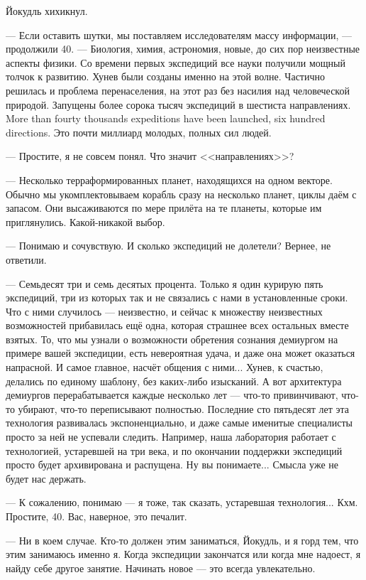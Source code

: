 Йокудль хихикнул.

--- Если оставить шутки, мы поставляем исследователям массу информации, --- продолжили 40.
--- Биология, химия, астрономия, новые, до сих пор неизвестные аспекты физики.
Со времени первых экспедиций все науки получили мощный толчок к развитию.
Хунев были созданы именно на этой волне.
Частично решилась и проблема перенаселения, на этот раз без насилия над человеческой природой.
{Запущены более сорока тысяч экспедиций в шестиста направлениях.}
{More than fourty thousands expeditions have been launched, six hundred directions.}
Это почти миллиард молодых, полных сил людей.

--- Простите, я не совсем понял.
Что значит <<направлениях>>?

--- Несколько терраформированных планет, находящихся на одном векторе.
Обычно мы укомплектовываем корабль сразу на несколько планет, циклы даём с запасом.
Они высаживаются по мере прилёта на те планеты, которые им приглянулись.
Какой-никакой выбор.

--- Понимаю и сочувствую.
И сколько экспедиций не долетели?
Вернее, не ответили.

--- Семьдесят три и семь десятых процента.
Только я один курирую пять экспедиций, три из которых так и не связались с нами в установленные сроки.
Что с ними случилось --- неизвестно, и сейчас к множеству неизвестных возможностей прибавилась ещё одна, которая страшнее всех остальных вместе взятых.
То, что мы узнали о возможности обретения сознания демиургом на примере вашей экспедиции, есть невероятная удача, и даже она может оказаться напрасной.
И самое главное, насчёт общения с ними...
Хунев, к счастью, делались по единому шаблону, без каких-либо изысканий.
А вот архитектура демиургов перерабатывается каждые несколько лет --- что-то привинчивают, что-то убирают, что-то переписывают полностью.
Последние сто пятьдесят лет эта технология развивалась экспоненциально, и даже самые именитые специалисты просто за ней не успевали следить.
Например, наша лаборатория работает с технологией, устаревшей на три века, и по окончании поддержки экспедиций просто будет архивирована и распущена.
Ну вы понимаете...
Смысла уже не будет нас держать.

--- К сожалению, понимаю --- я тоже, так сказать, устаревшая технология...
Кхм.
Простите, 40.
Вас, наверное, это печалит.

--- Ни в коем случае.
Кто-то должен этим заниматься, Йокудль, и я горд тем, что этим занимаюсь именно я.
Когда экспедиции закончатся или когда мне надоест, я найду себе другое занятие.
Начинать новое --- это всегда увлекательно.

